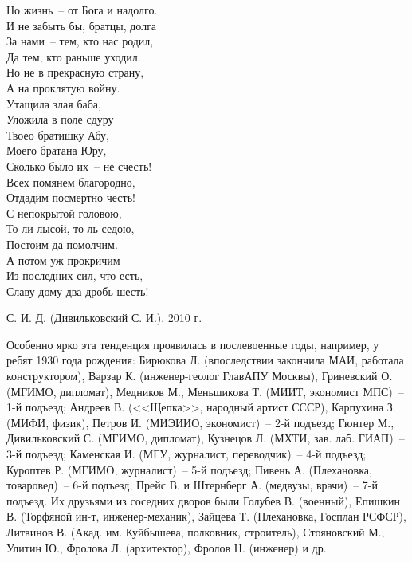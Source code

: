 \begin{small}
\begin{multicols}{2}
    \vfill
    \noindent
    Но жизнь~-- от Бога и надолго.\\
    И не забыть бы, братцы, долга\\
    За нами~-- тем, кто нас родил,\\
    Да тем, кто раньше уходил.\\
    Но не в прекрасную страну,\\
    А на проклятую войну.\\
    \vfill
    \noindent
    Утащила злая баба,\\
    Уложила в поле сдуру\\
    Твоео братишку Абу,\\
    Моего братана Юру,\\
    Сколько было их~-- не счесть!\\
    Всех помянем благородно,\\
    Отдадим посмертно честь!\\
    \vfill
    \noindent
    С непокрытой головою,\\
    То ли лысой, то ль седою,\\
    Постоим да помолчим.\\
    А потом уж прокричим\\
    Из последних сил, что есть,\\
    Славу дому два дробь шесть!\\



\end{multicols}


{\raggedleft С. И. Д. (Дивильковский С. И.), 2010 г. 

}
\end{small}
\vspace*{-5mm}


\restoregeometry

Особенно ярко эта тенденция проявилась в послевоенные годы, например, у ребят 1930 года рождения: Бирюкова Л. (впоследствии закончила МАИ, работала конструктором), Варзар К. (инженер-геолог ГлавАПУ Москвы), Гриневский О. (МГИМО, дипломат), Медников М., Меньшикова Т. (МИИТ, экономист МПС)~-- 1-й подъезд; Андреев В. (<<Щепка>>, народный артист СССР), Карпухина З. (МИФИ, физик), Петров И. (МИЭИИО, экономист)~-- 2-й подъезд; Гюнтер М., Дивильковский С. (МГИМО, дипломат), Кузнецов Л. (МХТИ, зав. лаб. ГИАП)~-- 3-й подъезд; Каменская И. (МГУ, журналист, переводчик)~-- 4-й подъезд; Куроптев Р. (МГИМО, журналист)~-- 5-й подъезд; Пивень А. (Плехановка, товаровед)~-- 6-й подъезд; Прейс В. и Штернберг А. (медвузы, врачи)~-- 7-й подъезд. Их друзьями из соседних дворов были Голубев В. (военный), Епишкин В. (Торфяной ин-т, инженер-механик), Зайцева Т. (Плехановка, Госплан РСФСР), Литвинов В. (Акад. им. Куйбышева, полковник, строитель), Стояновский М., Улитин Ю., Фролова Л. (архитектор), Фролов Н. (инженер) и др.

